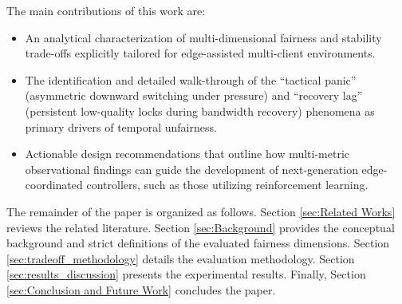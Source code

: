 \documentclass[conference,a4paper]{IEEEtran}
\begin{document}
{    The main contributions of this work are: 
    \begin{itemize}[leftmargin=*, noitemsep, topsep=2pt, parsep=0pt]
        \item An analytical characterization of multi-dimensional fairness and stability trade-offs explicitly tailored for edge-assisted multi-client environments.
        \item The identification and detailed walk-through of the ``tactical panic'' (asymmetric downward switching under pressure) and ``recovery lag'' (persistent low-quality locks during bandwidth recovery) phenomena as primary drivers of temporal unfairness.
        \item Actionable design recommendations that outline how multi-metric observational findings can guide the development of next-generation edge-coordinated controllers, such as those utilizing reinforcement learning.
    \end{itemize}

    The remainder of the paper is organized as follows. Section \ref{sec:Related Works} reviews the related literature. Section \ref{sec:Background} provides the conceptual background and strict definitions of the evaluated fairness dimensions. Section \ref{sec:tradeoff_methodology} details the evaluation methodology. Section \ref{sec:results_discussion} presents the experimental results. Finally, Section \ref{sec:Conclusion and Future Work} concludes the paper.}
\end{document}
